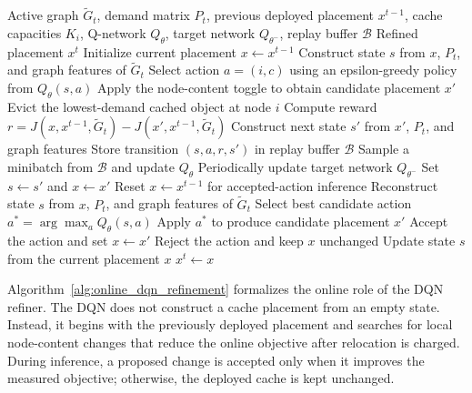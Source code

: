 \begin{algorithm}[H]
\caption{Transition-Aware Online DQN Refinement}
\label{alg:online_dqn_refinement}
\begin{algorithmic}[1]
\Require Active graph \(\tilde{G}_t\), demand matrix \(P_t\), previous deployed placement \(x^{t-1}\), cache capacities \(K_i\), Q-network \(Q_\theta\), target network \(Q_{\theta^-}\), replay buffer \(\mathcal{B}\)
\Ensure Refined placement \(x^t\)
\State Initialize current placement \(x \leftarrow x^{t-1}\)
\State Construct state \(s\) from \(x\), \(P_t\), and graph features of \(\tilde{G}_t\)
        \State Select action \(a=(i,c)\) using an epsilon-greedy policy from \(Q_\theta(s,a)\)
        \State Apply the node-content toggle to obtain candidate placement \(x'\)
            \State Evict the lowest-demand cached object at node \(i\)
        \EndIf
        \State Compute reward \(r = J(x,x^{t-1},\tilde{G}_t) - J(x',x^{t-1},\tilde{G}_t)\)
        \State Construct next state \(s'\) from \(x'\), \(P_t\), and graph features
        \State Store transition \((s,a,r,s')\) in replay buffer \(\mathcal{B}\)
        \State Sample a minibatch from \(\mathcal{B}\) and update \(Q_\theta\)
        \State Periodically update target network \(Q_{\theta^-}\)
        \State Set \(s \leftarrow s'\) and \(x \leftarrow x'\)
    \EndFor
\EndFor
\State Reset \(x \leftarrow x^{t-1}\) for accepted-action inference
\State Reconstruct state \(s\) from \(x\), \(P_t\), and graph features of \(\tilde{G}_t\)
    \State Select best candidate action \(a^*=\arg\max_a Q_\theta(s,a)\)
    \State Apply \(a^*\) to produce candidate placement \(x'\)
        \State Accept the action and set \(x \leftarrow x'\)
    \Else
        \State Reject the action and keep \(x\) unchanged
    \EndIf
    \State Update state \(s\) from the current placement \(x\)
\EndFor
\State \Return \(x^t \leftarrow x\)
\end{algorithmic}
\end{algorithm}

Algorithm~\ref{alg:online_dqn_refinement} formalizes the online role of the DQN refiner. The DQN does not construct a cache placement from an empty state. Instead, it begins with the previously deployed placement and searches for local node-content changes that reduce the online objective after relocation is charged. During inference, a proposed change is accepted only when it improves the measured objective; otherwise, the deployed cache is kept unchanged.

